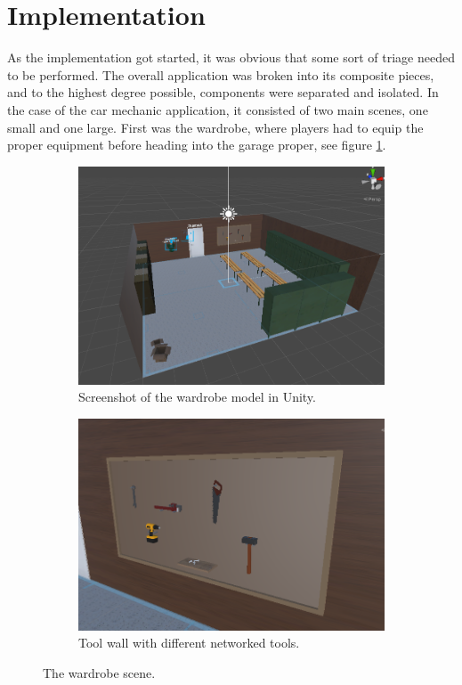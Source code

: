 \section{Implementation}
\label{section:Phase2Implentation}
As the implementation got started, it was obvious that some sort of triage needed to be performed. The overall application was broken into its composite pieces, and to the highest degree possible, components were separated and isolated. In the case of the car mechanic application, it consisted of two main scenes, one small and one large. First was the wardrobe, where players had to equip the proper equipment before heading into the garage proper, see figure \ref{fig:wardrobeApp}.


\begin{figure}[H]
  \centering
  \begin{subfigure}[b]{0.47\textwidth}
    \includegraphics[width=1\textwidth]{fig/phase_2/implementation/wardrobe.PNG}
    \caption{Screenshot of the wardrobe model in Unity.}
    \label{fig:wardrobeApp}
  \end{subfigure}
  \hfill%
  \begin{subfigure}[b]{0.47\textwidth}
    \includegraphics[width=1\textwidth]{fig/phase_2/implementation/toolsWall.PNG}
    \caption{Tool wall with different networked tools.}
    \label{fig:toolWall}
  \end{subfigure}
  \hfill%
  \caption{The wardrobe scene.}
  \label{fig:phase2Wardrobe}
\end{figure}



